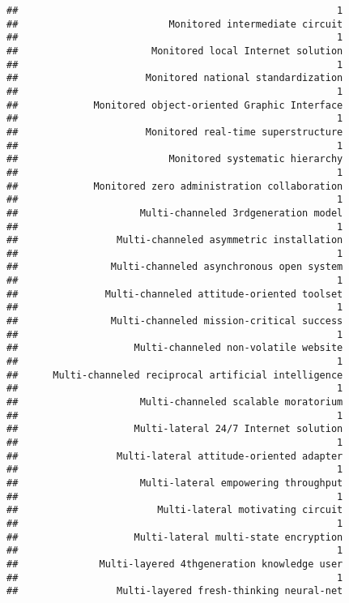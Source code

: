 \documentclass[
]{article}
\begin{document}
\begin{verbatim}
##                                                       1 
##                          Monitored intermediate circuit 
##                                                       1 
##                       Monitored local Internet solution 
##                                                       1 
##                      Monitored national standardization 
##                                                       1 
##             Monitored object-oriented Graphic Interface 
##                                                       1 
##                      Monitored real-time superstructure 
##                                                       1 
##                          Monitored systematic hierarchy 
##                                                       1 
##             Monitored zero administration collaboration 
##                                                       1 
##                     Multi-channeled 3rdgeneration model 
##                                                       1 
##                 Multi-channeled asymmetric installation 
##                                                       1 
##                Multi-channeled asynchronous open system 
##                                                       1 
##               Multi-channeled attitude-oriented toolset 
##                                                       1 
##                Multi-channeled mission-critical success 
##                                                       1 
##                    Multi-channeled non-volatile website 
##                                                       1 
##      Multi-channeled reciprocal artificial intelligence 
##                                                       1 
##                     Multi-channeled scalable moratorium 
##                                                       1 
##                    Multi-lateral 24/7 Internet solution 
##                                                       1 
##                 Multi-lateral attitude-oriented adapter 
##                                                       1 
##                     Multi-lateral empowering throughput 
##                                                       1 
##                        Multi-lateral motivating circuit 
##                                                       1 
##                    Multi-lateral multi-state encryption 
##                                                       1 
##              Multi-layered 4thgeneration knowledge user 
##                                                       1 
##                 Multi-layered fresh-thinking neural-net 

\end{verbatim}
\end{document}
